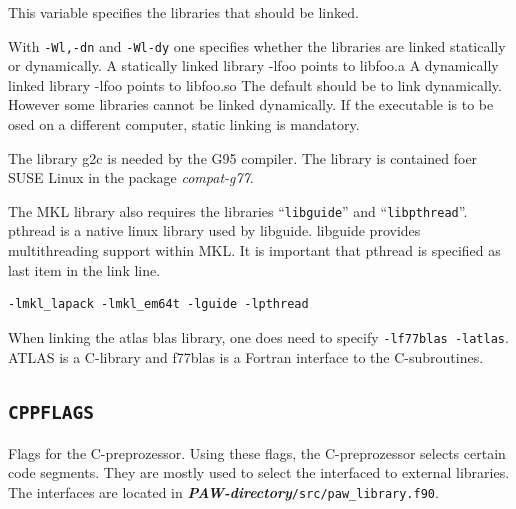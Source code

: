 \documentclass[a4paper,10pt]{report}
\newcommand{\myspec}[1]{\textbf{\textit{#1}}}
\newcommand{\mytt}[1]{{\tt #1}}
\begin{document}
This variable specifies the libraries that should be linked.

With \mytt{-Wl,-dn} and \mytt{-Wl-dy} one specifies whether the
libraries are linked statically or dynamically.  A statically linked
library -lfoo points to libfoo.a A dynamically linked library -lfoo
points to libfoo.so The default should be to link dynamically. However
some libraries cannot be linked dynamically. If the executable is to
be osed on a different computer, static linking is mandatory.

The library g2c is needed by the G95 compiler. The library is
contained foer SUSE Linux in the package \textit{compat-g77}.

The MKL library also requires the libraries ``\mytt{libguide}'' and
``\mytt{libpthread}''. pthread is a native linux library used by
libguide. libguide provides multithreading support within MKL. It is
important that pthread is specified as last item in the link line.
\begin{verbatim}
-lmkl_lapack -lmkl_em64t -lguide -lpthread
\end{verbatim}

When linking the atlas blas library, one does need to specify
\mytt{-lf77blas -latlas}. ATLAS is a C-library and f77blas is a
Fortran interface to the C-subroutines. 


\subsection{\mytt{CPPFLAGS}}\label{sec:cppflags}

Flags for the C-preprozessor. Using these flags, the C-preprozessor
selects certain code segments. They are mostly used to select the
interfaced to external libraries.  The interfaces are located in
\myspec{PAW-directory}\mytt{/src/paw\_library.f90}.
\end{document}
